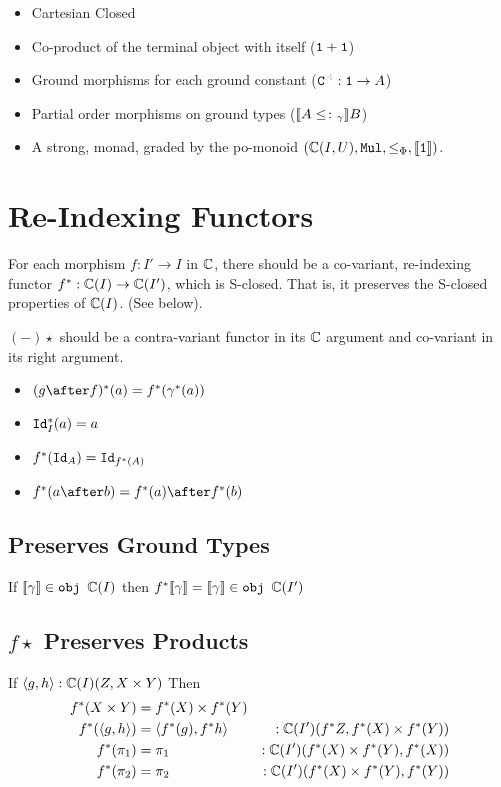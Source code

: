 \documentclass{report}
\begin{document}
\begin{itemize}
    \item Cartesian Closed
    \item Co-product of the terminal object with itself ($\texttt{1} + \texttt{1}$)
    \item Ground morphisms for each ground constant ($\const{A}: \1\rightarrow A$)
    \item Partial order morphisms on ground types (${\bf [\![}A\leq\colon_\gamma{\bf ]\!]} B$)
    \item A strong, monad, graded by the po-monoid $(\mathbb{C}(I, U), \texttt{Mul}, \leq_{\Phi}, {\bf [\![}\texttt{1}{\bf ]\!]})$.
\end{itemize}


\section{Re-Indexing Functors}
For each morphism $f: I' \rightarrow I$ in $\mathbb{C}$, there should be a co-variant, re-indexing functor  $f^*: \mathbb{C}(I) \rightarrow \mathbb{C}(I')$, which is S-closed. That is, it preserves the S-closed properties of $\mathbb{C}(I)$. (See below).

$(-)\star$ should be a contra-variant functor in its $\mathbb{C}$ argument and co-variant in its right argument.

\begin{itemize}
    \item $(g\after f)\star(a) = f\star(\g\star(a))$
    \item $\texttt{Id}_{I}^*(a) = a$
    \item $f^*(\texttt{Id}_{A}) = \texttt{Id}_{f^*(A)}$
    \item $f\star(a\after b) = f\star(a)\after f\star(b)$
\end{itemize}
\subsection{Preserves Ground Types}
If ${\bf [\![}\gamma{\bf ]\!]}\in\texttt{obj }\mathbb{C}(I)$ then $f^*{\bf [\![}\gamma{\bf ]\!]} = {\bf [\![}\gamma{\bf ]\!]}\in\texttt{obj }\mathbb{C}(I')$
\subsection{$f\star$ Preserves Products}
If $\langle g, h\rangle:\mathbb{C}(I)(Z, X\times Y)$
Then 
\begin{align*}
    f^*(X\times Y) & = f^*(X)\times f^*(Y)\\
    f^*(\langle g, h\rangle) & = \langle f^*(g), f^*{h}\rangle&:\mathbb{C}(I')(f^* Z, f^*(X)\times f^*(Y))\\
    f^*(\pi_1) & = \pi_1&:\mathbb{C}(I')(f^*(X)\times f^*(Y), f^*(X)) \\
    f^*(\pi_2) &= \pi_2&:\mathbb{C}(I')(f^*(X)\times f^*(Y), f^*(Y))
\end{align*}
\end{document}
